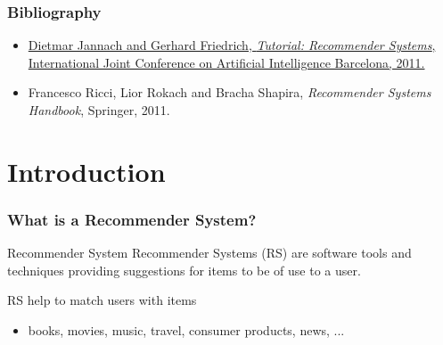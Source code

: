 \documentclass{beamer}
\subtitle{Recommender Systems}
\begin{document}
\maketitle


\makeoutline

\begin{frame}
    \frametitle{Bibliography}
    \begin{block}{}
        \begin{itemize}
        \item \href{http://ijcai-11.iiia.csic.es/program/tutorials}{Dietmar
              Jannach and Gerhard Friedrich, \textit{Tutorial: Recommender
                Systems}, International Joint Conference on Artificial
              Intelligence Barcelona, 2011.}
        \item Francesco Ricci, Lior Rokach and Bracha Shapira,
            \textit{Recommender Systems Handbook}, Springer, 2011.
        \end{itemize}
    \end{block}
\end{frame}

\section{Introduction}

\begin{frame}
    \frametitle{What is a Recommender System?}
    \begin{block}{Recommender System}
        Recommender Systems (RS) are software tools and techniques providing
        suggestions for items to be of use to a user.
    \end{block}
    \vsep
    RS help to match users with items
    \begin{itemize}
    \item books, movies, music, travel, consumer products, news, ...
    \end{itemize}
\end{frame}
\end{document}
